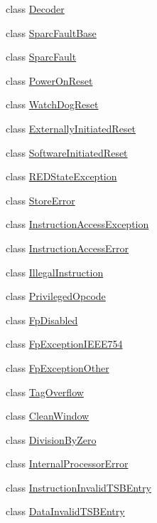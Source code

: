 \begin{DoxyCompactItemize}
\item 
class \hyperlink{classSparcISA_1_1Decoder}{Decoder}
\item 
class \hyperlink{classSparcISA_1_1SparcFaultBase}{SparcFaultBase}
\item 
class \hyperlink{classSparcISA_1_1SparcFault}{SparcFault}
\item 
class \hyperlink{classSparcISA_1_1PowerOnReset}{PowerOnReset}
\item 
class \hyperlink{classSparcISA_1_1WatchDogReset}{WatchDogReset}
\item 
class \hyperlink{classSparcISA_1_1ExternallyInitiatedReset}{ExternallyInitiatedReset}
\item 
class \hyperlink{classSparcISA_1_1SoftwareInitiatedReset}{SoftwareInitiatedReset}
\item 
class \hyperlink{classSparcISA_1_1REDStateException}{REDStateException}
\item 
class \hyperlink{classSparcISA_1_1StoreError}{StoreError}
\item 
class \hyperlink{classSparcISA_1_1InstructionAccessException}{InstructionAccessException}
\item 
class \hyperlink{classSparcISA_1_1InstructionAccessError}{InstructionAccessError}
\item 
class \hyperlink{classSparcISA_1_1IllegalInstruction}{IllegalInstruction}
\item 
class \hyperlink{classSparcISA_1_1PrivilegedOpcode}{PrivilegedOpcode}
\item 
class \hyperlink{classSparcISA_1_1FpDisabled}{FpDisabled}
\item 
class \hyperlink{classSparcISA_1_1FpExceptionIEEE754}{FpExceptionIEEE754}
\item 
class \hyperlink{classSparcISA_1_1FpExceptionOther}{FpExceptionOther}
\item 
class \hyperlink{classSparcISA_1_1TagOverflow}{TagOverflow}
\item 
class \hyperlink{classSparcISA_1_1CleanWindow}{CleanWindow}
\item 
class \hyperlink{classSparcISA_1_1DivisionByZero}{DivisionByZero}
\item 
class \hyperlink{classSparcISA_1_1InternalProcessorError}{InternalProcessorError}
\item 
class \hyperlink{classSparcISA_1_1InstructionInvalidTSBEntry}{InstructionInvalidTSBEntry}
\item 
class \hyperlink{classSparcISA_1_1DataInvalidTSBEntry}{DataInvalidTSBEntry}

\end{DoxyCompactItemize}
